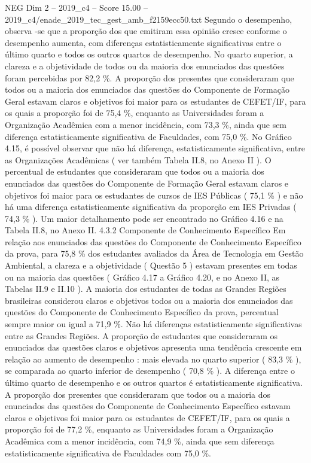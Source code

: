 \begin{textsample}{NEG Dim 2 – 2019\_c4 – Score 15.00 – 2019\_c4/enade\_2019\_tec\_gest\_amb\_f2159ecc50.txt}
Segundo o desempenho, observa -se que a proporção dos que emitiram essa opinião cresce conforme o desempenho aumenta, com diferenças estatisticamente significativas entre o último quarto e todos os outros quartos de desempenho.
No quarto superior, a clareza e a objetividade de todos ou da maioria dos enunciados das questões foram percebidas por 82,2 \%.
A proporção dos presentes que consideraram que todos ou a maioria dos enunciados das questões do Componente de Formação Geral estavam claros e objetivos foi maior para os estudantes de CEFET/IF, para os quais a proporção foi de 75,4 \%, enquanto as Universidades foram a Organização Acadêmica com a menor incidência, com 73,3 \%, ainda que sem diferença estatisticamente significativa de Faculdades, com 75,0 \%.
No Gráfico 4.15, é possível observar que não há diferença, estatisticamente significativa, entre as Organizações Acadêmicas ( ver também Tabela II.8, no Anexo II ).
O percentual de estudantes que consideraram que todos ou a maioria dos enunciados das questões do Componente de Formação Geral estavam claros e objetivos foi maior para os estudantes de cursos de IES Públicas ( 75,1 \% ) e não há uma diferença estatisticamente significativa da proporção em IES Privadas ( 74,3 \% ).
Um maior detalhamento pode ser encontrado no Gráfico 4.16 e na Tabela II.8, no Anexo II. 4.3.2 Componente de Conhecimento Específico Em relação aos enunciados das questões do Componente de Conhecimento Específico da prova, para 75,8 \% dos estudantes avaliados da Área de Tecnologia em Gestão Ambiental, a clareza e a objetividade ( Questão 5 ) estavam presentes em todas ou na maioria das questões ( Gráfico 4.17 a Gráfico 4.20, e no Anexo II, as Tabelas II.9 e II.10 ).
A maioria dos estudantes de todas as Grandes Regiões brasileiras considerou claros e objetivos todos ou a maioria dos enunciados das questões do Componente de Conhecimento Específico da prova, percentual sempre maior ou igual a 71,9 \%.
Não há diferenças estatisticamente significativas entre as Grandes Regiões.
A proporção de estudantes que consideraram os enunciados das questões claros e objetivos apresenta uma tendência crescente em relação ao aumento de desempenho : mais elevada no quarto superior ( 83,3 \% ), se comparada ao quarto inferior de desempenho ( 70,8 \% ).
A diferença entre o último quarto de desempenho e os outros quartos é estatisticamente significativa.
A proporção dos presentes que consideraram que todos ou a maioria dos enunciados das questões do Componente de Conhecimento Específico estavam claros e objetivos foi maior para os estudantes de CEFET/IF, para os quais a proporção foi de 77,2 \%, enquanto as Universidades foram a Organização Acadêmica com a menor incidência, com 74,9 \%, ainda que sem diferença estatisticamente significativa de Faculdades com 75,0 \%.

\end{textsample}
